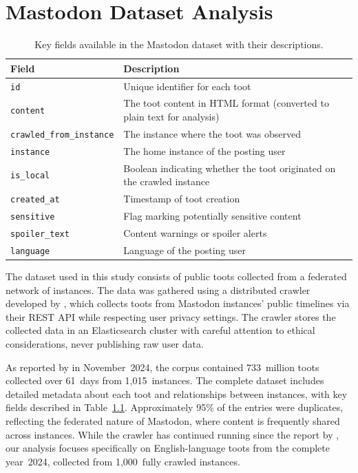 \chapter{Mastodon Dataset Analysis} \label{dataset-description}

\begin{table}[tb]
    \centering\small
    \renewcommand{\arraystretch}{1.3}
    \begin{tabularx}{\textwidth}{lX}
        \toprule
        \textbf{Field} & \textbf{Description} \\
        \midrule
        \texttt{id} & Unique identifier for each toot \\
        \texttt{content} & The toot content in HTML format (converted to plain text for analysis) \\
        \texttt{crawled\_from\_instance} & The instance where the toot was observed \\
        \texttt{instance} & The home instance of the posting user \\
        \texttt{is\_local} & Boolean indicating whether the toot originated on the crawled instance \\
        \texttt{created\_at} & Timestamp of toot creation \\
        \texttt{sensitive} & Flag marking potentially sensitive content \\
        \texttt{spoiler\_text} & Content warnings or spoiler alerts \\
        \texttt{language} & Language of the posting user \\
        \bottomrule
    \end{tabularx}
    \caption{Key fields available in the Mastodon dataset with their descriptions.}
    \label{dataset-fields}
\end{table}

The dataset used in this study consists of public toots collected from a federated network of instances. The data was gathered using a distributed crawler developed by \citet{wiegmann:2024}, which collects toots from Mastodon instances' public timelines via their REST API while respecting user privacy settings. The crawler stores the collected data in an Elasticsearch cluster with careful attention to ethical considerations, never publishing raw user data.

As reported by \citet{wiegmann:2024} in November~2024, the corpus contained 733~million toots collected over 61~days from 1,015~instances. The complete dataset includes detailed metadata about each toot and relationships between instances, with key fields described in Table~\ref{dataset-fields}. Approximately 95\% of the entries were duplicates, reflecting the federated nature of Mastodon, where content is frequently shared across instances. While the crawler has continued running since the report by \cite{wiegmann:2024}, our analysis focuses specifically on English-language toots from the complete year~2024, collected from 1,000~fully crawled instances.

